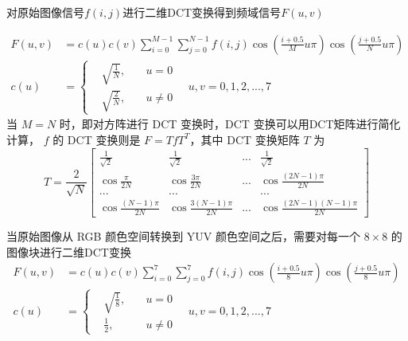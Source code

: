 对原始图像信号$f(i,j)$进行二维DCT变换得到频域信号$F(u,v)$

\begin{equation}
    \begin{aligned}
        F(u,v) &=c(u)c(v) \sum_{i=0}^{M-1} \sum_{j=0}^{N-1} f(i,j) \cos(\frac{i+0.5}{M}u\pi) \cos(\frac{j+0.5}{N}u\pi) \\
        c(u) &=\left\{\begin{aligned}
            & \sqrt{\frac{1}{N}}, & \quad u=0 \\
            & \sqrt{\frac{2}{N}}, & \quad u\neq 0
        \end{aligned}\right.
        \quad u,v=0,1,2,...,7
    \end{aligned}
\end{equation}
当 $M=N$ 时，即对方阵进行 DCT 变换时，DCT 变换可以用DCT矩阵进行简化计算， $f$ 的 DCT 变换则是 $F=TfT^T$，其中 DCT 变换矩阵 $T$ 为
\begin{equation}
    T=\frac{2}{\sqrt{N}}
    \begin{bmatrix}
        \frac{1}{\sqrt{2}}      & \frac{1}{\sqrt{2}}        & ...   & \frac{1}{\sqrt{2}} \\
        \cos\frac{\pi}{2N}      & \cos\frac{3\pi}{2N}       & ...   & \cos\frac{(2N-1)\pi}{2N} \\
        ...                     & ...                       &       & ... \\
        \cos\frac{(N-1)\pi}{2N} & \cos\frac{3(N-1)\pi}{2N}  & ...   & \cos\frac{(2N-1)(N-1)\pi}{2N}
    \end{bmatrix}
\end{equation}


当原始图像从 RGB 颜色空间转换到 YUV 颜色空间之后，需要对每一个 $8 \times 8$ 的图像块进行二维DCT变换
\begin{equation}
    \begin{aligned}
        F(u,v) &=c(u)c(v) \sum_{i=0}^{7} \sum_{j=0}^{7} f(i,j) \cos(\frac{i+0.5}{8}u\pi) \cos(\frac{j+0.5}{8}u\pi) \\
        c(u) &=\left\{\begin{aligned}
            & \sqrt{\frac{1}{8}},   & \quad u=0 \\
            & \frac{1}{2},          & \quad u\neq 0
        \end{aligned}\right.
        \quad u,v=0,1,2,...,7
    \end{aligned}
\end{equation}

